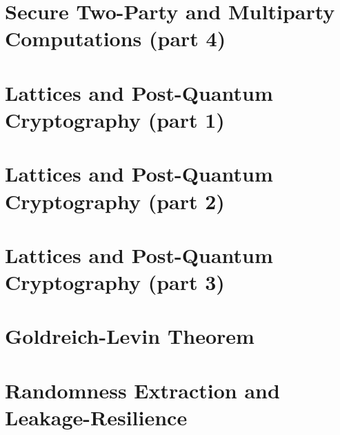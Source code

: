 \documentclass{llncs}
\begin{document}
\section{Secure Two-Party and Multiparty Computations (part 4)}

\section{Lattices and Post-Quantum Cryptography (part 1)}

\section{Lattices and Post-Quantum Cryptography (part 2)}

\section{Lattices and Post-Quantum Cryptography (part 3)}

\section{Goldreich-Levin Theorem}

\section{Randomness Extraction and Leakage-Resilience}


\printbibliography %
\end{document}
